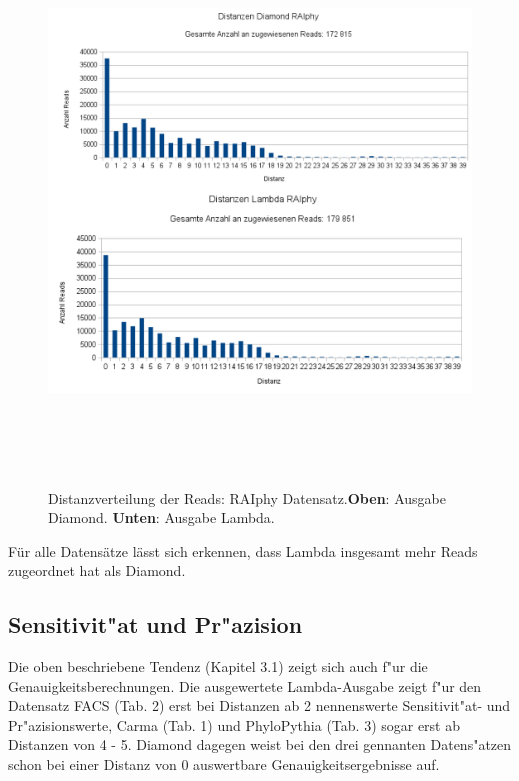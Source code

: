\documentclass[10pt, a4paper]{article}[08.12.2015]
\begin{document}
     \begin{figure}[H]
      \centering
      \noindent\includegraphics[width=\linewidth,height=15cm,
      keepaspectratio]{Abbildungen/RAIphy_Distanzen_both.png}
      \caption[Distanzverteilung der Reads: RAIphy Datensatz.]{\small{Distanzverteilung der Reads: RAIphy Datensatz.\newline \textbf{Oben}: Ausgabe Diamond. \textbf{Unten}: Ausgabe Lambda.}}
    \end{figure}
    
    F\"ur alle Datens\"atze l\"asst sich erkennen, dass Lambda insgesamt 
    mehr Reads zugeordnet hat als Diamond.
    \newpage
     \subsection{Sensitivit"at und Pr"azision}
       Die oben beschriebene Tendenz (Kapitel 3.1) zeigt sich auch f"ur die Genauigkeitsberechnungen. Die ausgewertete Lambda-Ausgabe zeigt f"ur den Datensatz FACS (Tab. 2) erst bei Distanzen ab 2 nennenswerte  Sensitivit"at- und Pr"azisionswerte, Carma (Tab. 1) und PhyloPythia (Tab. 3) sogar erst ab Distanzen von 4 - 5. Diamond dagegen weist bei den drei gennanten Datens"atzen schon bei einer Distanz von 0 auswertbare Genauigkeitsergebnisse auf.
     
\end{document}
